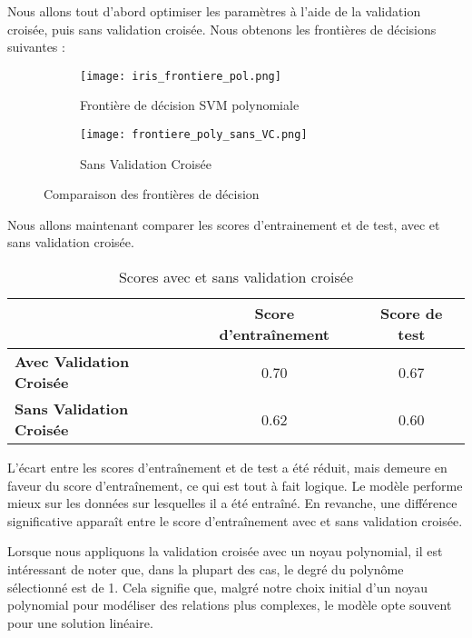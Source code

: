 \documentclass{article}
\begin{document}
Nous allons tout d'abord optimiser les paramètres à l'aide de la validation croisée, puis sans validation croisée.
Nous obtenons les frontières de décisions suivantes :






\begin{figure}[H]
    \centering
    \begin{subfigure}{0.45\linewidth}
        \centering
        \texttt{[image: iris\_frontiere\_pol.png]}
        \caption{Frontière de décision SVM polynomiale}
        \label{fig:sans_vc}
    \end{subfigure}
    \hfill
    \begin{subfigure}{0.45\linewidth}
        \centering
        \texttt{[image: frontiere\_poly\_sans\_VC.png]}
        \caption{Sans Validation Croisée}
        \label{fig:avec_vc}
    \end{subfigure}
    \caption{Comparaison des frontières de décision}
    \label{fig:comparaison}
\end{figure}


Nous allons maintenant comparer les scores d'entrainement et de test, avec et sans validation croisée.

\begin{table}[h]
    \centering
    \begin{tabular}{|l|c|c|}
        \hline
        & \textbf{Score d'entraînement} & \textbf{Score de test} \\ 
        \hline
        \textbf{Avec Validation Croisée} & 0.70 & 0.67 \\ 
        \hline
        \textbf{Sans Validation Croisée} & 0.62 & 0.60 \\ 
        \hline
    \end{tabular}
    \caption{Scores avec et sans validation croisée}
\end{table}





L'écart entre les scores d'entraînement et de test a été réduit, mais demeure en faveur du score d'entraînement, ce qui est tout à fait logique. Le modèle performe mieux sur les données sur lesquelles il a été entraîné. En revanche, une différence significative apparaît entre le score d'entraînement avec et sans validation croisée.

Lorsque nous appliquons la validation croisée avec un noyau polynomial, il est intéressant de noter que, dans la plupart des cas, le degré du polynôme sélectionné est de 1. Cela signifie que, malgré notre choix initial d'un noyau polynomial pour modéliser des relations plus complexes, le modèle opte souvent pour une solution linéaire.
\end{document}
